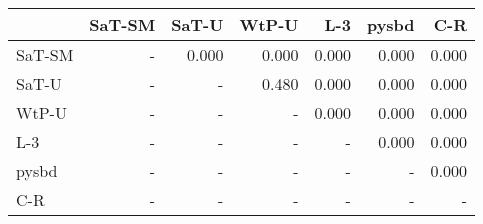 \begin{tabular}{lrrrrrr}
\toprule
 & SaT-SM & SaT-U & WtP-U & L-3 & pysbd & C-R \\
\midrule
SaT-SM & - & 0.000 & 0.000 & 0.000 & 0.000 & 0.000 \\
SaT-U & - & - & 0.480 & 0.000 & 0.000 & 0.000 \\
WtP-U & - & - & - & 0.000 & 0.000 & 0.000 \\
L-3 & - & - & - & - & 0.000 & 0.000 \\
pysbd & - & - & - & - & - & 0.000 \\
C-R & - & - & - & - & - & - \\
\bottomrule
\end{tabular}

